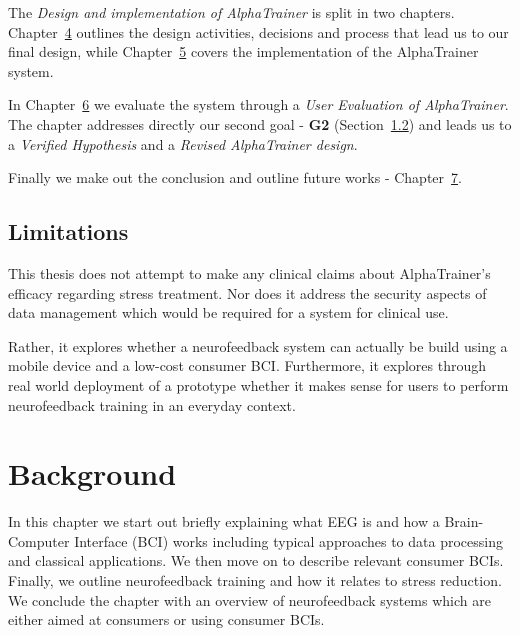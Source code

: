 \documentclass[a4paper,10pt,english,lof,lot,twoside]{puthesis}
\begin{document}
The \emph{Design and implementation of AlphaTrainer} is split in two chapters.
Chapter {\hyperref[ch-design/index:ch-design]{4}} outlines the design activities, decisions and
process that lead us to our final design, while Chapter {\hyperref[ch-implementation/index:ch-implementation]{5}} covers the implementation of the AlphaTrainer system.

In Chapter {\hyperref[ch-evaluation/index:ch-evaluation]{6}} we evaluate the system through a
\emph{User Evaluation of AlphaTrainer}. The chapter addresses directly our
second goal - \textbf{G2} (Section {\hyperref[ch-intro/index:ch-intro-hypothesis-goals]{1.2}}) and leads
us to a \emph{Verified Hypothesis} and a \emph{Revised AlphaTrainer design}.

Finally we make out the conclusion and outline future works - Chapter {\hyperref[ch-conclusion/index:ch-conclusion]{7}}.


\section{Limitations}
\label{ch-intro/index:ch-intro-limitations}\label{ch-intro/index:limitations}
This thesis does not attempt to make any clinical claims about AlphaTrainer's
efficacy regarding stress treatment. Nor does it address the security aspects
of data management which would be required for a system for clinical use.

Rather, it explores whether a neurofeedback system can actually be build
using a mobile device and a low-cost consumer BCI. Furthermore, it explores
through real world deployment of a prototype whether it makes sense for users
to perform neurofeedback training in an everyday context.


\chapter{Background}
\label{ch-background/index:ch-background}\label{ch-background/index::doc}\label{ch-background/index:background}
In this chapter we start out briefly explaining what EEG is and how a
Brain-Computer Interface (BCI) works including typical approaches to data
processing and classical applications. We then move on to describe relevant
consumer BCIs. Finally, we outline neurofeedback training and how it relates to
stress reduction. We conclude the chapter with an overview of neurofeedback
systems which are either aimed at consumers or using consumer BCIs.
\end{document}
